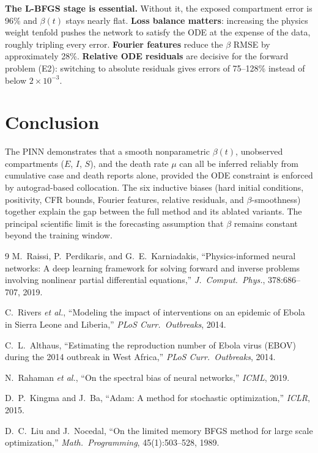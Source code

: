 \documentclass[11pt,a4paper]{article}
\theoremstyle{remark}
\begin{document}
\textbf{The L-BFGS stage is essential.} Without it, the exposed compartment
error is 96\% and $\beta(t)$ stays nearly flat.  \textbf{Loss balance
matters}: increasing the physics weight tenfold pushes the network to satisfy
the ODE at the expense of the data, roughly tripling every error.
\textbf{Fourier features} reduce the $\beta$ RMSE by approximately 28\%.
\textbf{Relative ODE residuals} are decisive for the forward problem (E2):
switching to absolute residuals gives errors of 75--128\% instead of below
$2\times10^{-3}$.

\section*{Conclusion}

The PINN demonstrates that a smooth nonparametric $\beta(t)$, unobserved
compartments ($E$, $I$, $S$), and the death rate $\mu$ can all be inferred
reliably from cumulative case and death reports alone, provided the ODE
constraint is enforced by autograd-based collocation.  The six inductive
biases (hard initial conditions, positivity, CFR bounds, Fourier features,
relative residuals, and $\beta$-smoothness) together explain the gap between
the full method and its ablated variants.  The principal scientific limit
is the forecasting assumption that $\beta$ remains constant beyond the
training window.

\begin{thebibliography}{9}
  M.~Raissi, P.~Perdikaris, and G.~E.~Karniadakis,
  ``Physics-informed neural networks: A deep learning framework for solving forward and inverse problems involving nonlinear partial differential equations,''
  \emph{J.\ Comput.\ Phys.}, 378:686--707, 2019.

  C.~Rivers \emph{et al.},
  ``Modeling the impact of interventions on an epidemic of Ebola in Sierra Leone and Liberia,''
  \emph{PLoS Curr.\ Outbreaks}, 2014.

  C.~L.~Althaus,
  ``Estimating the reproduction number of Ebola virus (EBOV) during the 2014 outbreak in West Africa,''
  \emph{PLoS Curr.\ Outbreaks}, 2014.

  N.~Rahaman \emph{et al.},
  ``On the spectral bias of neural networks,''
  \emph{ICML}, 2019.

  D.~P.~Kingma and J.~Ba,
  ``Adam: A method for stochastic optimization,''
  \emph{ICLR}, 2015.

  D.~C.~Liu and J.~Nocedal,
  ``On the limited memory BFGS method for large scale optimization,''
  \emph{Math.\ Programming}, 45(1):503--528, 1989.
\end{thebibliography}
\end{document}
